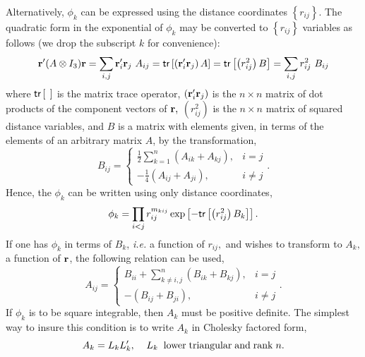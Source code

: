 {{Alternatively, $\phi _k$ can be expressed using the distance coordinates $%
\left\{ r_{ij}\right\} $. The quadratic form in the exponential of $\phi _k$
may be converted to $\left\{ r_{ij}\right\} $ variables as follows (we drop
the subscript $k$ for convenience):
\begin{equation}
{\bf r}^{\prime }(A\otimes I_3){\bf r} = \sum_{i,j}{\bf r}%
_i^{\prime }{\bf r}_j\,\,A_{ij} 
= {\sf tr}\left[ \left( {\bf r}_i^{\prime }{\bf r}_j\right) A\right] 
= {\sf tr}\left[ \left( r_{ij}^2\right) B\right]  
= \sum_{i,j}r_{ij}^2\,\,B_{ij}
\end{equation}
where ${\sf tr}\left[ \:\: {}\right] $ 
is the matrix trace operator, $\left( 
{\bf r}_i^{\prime }{\bf r}_j\right) $ is the $n\times n$ matrix of dot
products of the component vectors of ${\bf r},$ $\left( r_{ij}^2\right) $
is the $n\times n$ matrix of squared distance variables, and $B$ is a matrix
with elements given, in terms of the elements of an arbitrary matrix $A$, by
the transformation, 
\begin{equation}
B_{ij}=\left\{ 
\begin{array}{ll}
\frac 12\sum_{k=1}^{n}\left( A_{ik}+A_{kj}\right) , & i=j \\ 
-\frac 14\left( A_{ij}+A_{ji}\right) , & i\neq j
\end{array}
\right. .  \label{Btran}
\end{equation}
Hence, the $\phi _k$ can be written using only distance coordinates, 
\begin{equation}
\phi _k=\prod_{i<j}r_{ij}^{m_{kij}}\exp \left[ -{\sf tr}\left[ \left(
r_{ij}^2\right) B_k\right] \right] .
\end{equation}
If one has $\phi _k$ in terms of $B_k$, {\it i.e.} 
a function of $r_{ij},$ and
wishes to transform to $A_k,$ a function of ${\bf r}$, the following
relation can be used, 
\begin{equation}
A_{ij}=\left\{ 
\begin{array}{ll}
B_{ii}+\sum_{k\neq i,j}^{n}\left( B_{ik}+B_{kj}\right) , & i=j \\ 
-\left( B_{ij}+B_{ji}\right) , & i\neq j
\end{array}
\right. .  \label{Atran}
\end{equation}
If $\phi _k$ is to be square integrable, 
then $A_k$ must be positive definite. The simplest way to insure this
condition is to write $A_k$ in Cholesky factored form, 
\begin{equation}
A_k=L_kL_k^{\prime }, \; \; \; \;
L_k
{\rm \; \; lower  \; triangular \; and \;
rank \;}n.
\end{equation}

}}
